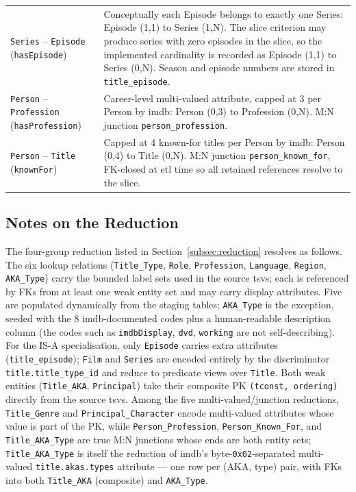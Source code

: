 \begin{table}[H]
\begin{tabularx}{\textwidth}{lX}
\texttt{Series} -- \texttt{Episode} (\texttt{hasEpisode}) & Conceptually each Episode belongs to exactly one Series: Episode (1,1) to Series (1,N). The slice criterion may produce series with zero episodes in the slice, so the implemented cardinality is recorded as Episode (1,1) to Series (0,N). Season and episode numbers are stored in \texttt{title\_episode}. \\
\texttt{Person} -- \texttt{Profession} (\texttt{hasProfession}) & Career-level multi-valued attribute, capped at 3 per Person by \ac{imdb}: Person (0,3) to Profession (0,N). M:N junction \texttt{person\_profession}. \\
\texttt{Person} -- \texttt{Title} (\texttt{knownFor}) & Capped at 4 known-for titles per Person by \ac{imdb}: Person (0,4) to Title (0,N). M:N junction \texttt{person\_known\_for}, FK-closed at \ac{etl} time so all retained references resolve to the slice. \\
\hline
\end{tabularx}
\end{table}

\subsection{Notes on the Reduction}

The four-group reduction listed in Section~\ref{subsec:reduction} resolves as follows. The six lookup relations (\texttt{Title\_Type}, \texttt{Role}, \texttt{Profession}, \texttt{Language}, \texttt{Region}, \texttt{AKA\_Type}) carry the bounded label sets used in the source \acp{tsv}; each is referenced by FKs from at least one weak entity set and may carry display attributes. Five are populated dynamically from the staging tables; \texttt{AKA\_Type} is the exception, seeded with the 8 \ac{imdb}-documented codes plus a human-readable description column (the codes such as \texttt{imdbDisplay}, \texttt{dvd}, \texttt{working} are not self-describing). For the IS-A specialisation, only \texttt{Episode} carries extra attributes (\texttt{title\_episode}); \texttt{Film} and \texttt{Series} are encoded entirely by the discriminator \texttt{title.title\_type\_id} and reduce to predicate views over \texttt{Title}. Both weak entities (\texttt{Title\_AKA}, \texttt{Principal}) take their composite PK \texttt{(tconst, ordering)} directly from the source \acp{tsv}. Among the five multi-valued/junction reductions, \texttt{Title\_Genre} and \texttt{Principal\_Character} encode multi-valued attributes whose value is part of the PK, while \texttt{Person\_Profession}, \texttt{Person\_Known\_For}, and \texttt{Title\_AKA\_Type} are true M:N junctions whose ends are both entity sets; \texttt{Title\_AKA\_Type} is itself the reduction of \ac{imdb}'s byte-\texttt{0x02}-separated multi-valued \texttt{title.akas.types} attribute --- one row per (AKA, type) pair, with FKs into both \texttt{Title\_AKA} (composite) and \texttt{AKA\_Type}.

